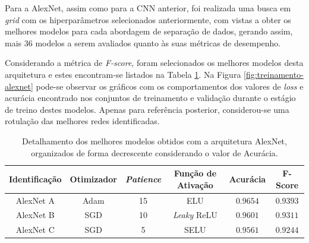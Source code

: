 Para a AlexNet, assim como para a CNN anterior, foi realizada uma busca em \emph{grid} com os hiperparâmetros selecionados anteriormente, com vistas a obter os melhores modelos para cada abordagem de separação de dados, gerando assim, mais $36$ modelos a serem avaliados quanto às suas métricas de desempenho.

Considerando a métrica de \emph{F-score}, foram selecionados os melhores modelos  desta arquitetura e estes encontram-se listados na Tabela \ref{tab:alexnet}. Na Figura \ref{fig:treinamento-alexnet} pode-se observar os gráficos com os comportamentos dos valores de \emph{loss} e acurácia encontrado nos conjuntos de treinamento e validação durante o estágio de treino destes modelos. Apenas para referência posterior, considerou-se uma rotulação das melhores redes identificadas.

\begin{table}[h!]
\centering
\caption{Detalhamento dos melhores modelos obtidos com a arquitetura AlexNet, organizados de forma decrescente considerando o valor de Acurácia.}
\label{tab:alexnet}
\begin{tabular}{cccccc}
\toprule
\textbf{Identificação} & \textbf{Otimizador} & \textbf{\emph{Patience}}  & \textbf{Função de Ativação} & \textbf{Acurácia} & \textbf{F-Score} \\
\midrule
AlexNet A & Adam & 15 & ELU & $0.9654$ & $0.9393$ \\
AlexNet B & SGD & 10 & \emph{Leaky} ReLU & $0.9601$ & $0.9311$ \\
AlexNet C & SGD & 5 & SELU & $0.9561$ & $0.9244$ \\
\bottomrule
\end{tabular}
\end{table}

